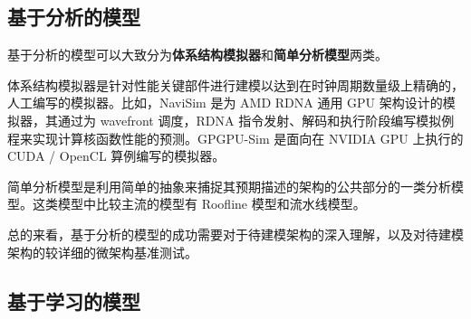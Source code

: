 \subsection{基于分析的模型}

基于分析的模型可以大致分为\textbf{体系结构模拟器}和\textbf{简单分析模型}两类。

体系结构模拟器是针对性能关键部件进行建模以达到在时钟周期数量级上精确的，人工编写的模拟器。比如，NaviSim \cite{10.1145/3559009.3569666} 是为 AMD RDNA 通用 GPU 架构设计的模拟器，其通过为 wavefront 调度，RDNA 指令发射、解码和执行阶段编写模拟例程来实现计算核函数性能的预测。GPGPU-Sim \cite{9138922, 4919648} 是面向在 NVIDIA GPU 上执行的 CUDA / OpenCL 算例编写的模拟器。

简单分析模型是利用简单的抽象来捕捉其预期描述的架构的公共部分的一类分析模型。这类模型中比较主流的模型有 Roofline 模型\cite{10.1145/1498765.1498785, KONSTANTINIDIS201737}和流水线模型\cite{LEMEIRE202332, 10289219, 10.1145/3524059.3532396}。 %

总的来看，基于分析的模型的成功需要对于待建模架构的深入理解，以及对待建模架构的较详细的微架构基准测试。


\subsection{基于学习的模型}

